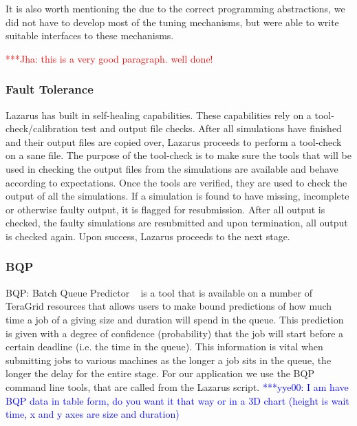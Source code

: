 \documentclass[conference,final]{IEEEtran}
\newcommand{\jhanote}[1]{ {\textcolor{red} { ***Jha: #1 }}}
\newcommand{\yyenote}[1]{ {\textcolor{blue} { ***yye00: #1 }}}
\begin{document}
It is also worth mentioning the due to the correct programming
abstractions, we did not have to develop most of the tuning
mechanisms, but were able to write suitable interfaces to these
mechanisms.

\jhanote{this is a very good paragraph. well done!}


\subsubsection{Fault Tolerance}
Lazarus has built in self-healing capabilities. These capabilities rely on
a tool-check/calibration test and output file checks. After all simulations
have finished and their output files are copied over, Lazarus proceeds to
perform a tool-check on a sane file. The purpose of the tool-check is to make sure
the tools that will be used in checking the output files from the simulations
are available and behave according to expectations. Once the tools are verified,
they are used to check the output of all the simulations. If a simulation is found
to have missing, incomplete or otherwise faulty output, it is flagged for resubmission.
After all output is checked, the faulty simulations are resubmitted and upon termination,
all output is checked again. Upon success, Lazarus proceeds to the next stage.


\subsubsection{BQP}
BQP: Batch Queue Predictor ~\cite{bqp} is a tool that is available on
a number of TeraGrid resources that allows users to make bound
predictions of how much time a job of a giving size and duration will
spend in the queue.  This prediction is given with a degree of
confidence (probability) that the job will start before a certain
deadline (i.e. the time in the queue).  This information is vital when
submitting jobs to various machines as the longer a job sits in the
queue, the longer the delay for the entire stage.  For our application
we use the BQP command line tools, that are called from the Lazarus
script.  \yyenote{I am have BQP data in table form, do you want it
  that way or in a 3D chart (height is wait time, x and y axes are
  size and duration)}
\end{document}
